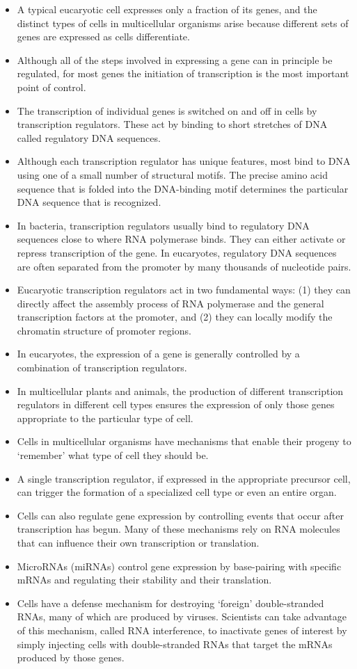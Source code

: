 \begin{itemize}
\item A typical eucaryotic cell expresses only a fraction of its genes, and
the distinct types of cells in multicellular organisms arise because
different sets of genes are expressed as cells differentiate.
\item Although all of the steps involved in expressing a gene can in principle
be regulated, for most genes the initiation of transcription is the
most important point of control.
\item The transcription of individual genes is switched on and off in cells
by transcription regulators. These act by binding to short stretches of
DNA called regulatory DNA sequences.
\item Although each transcription regulator has unique features, most bind
to DNA using one of a small number of structural motifs. The precise
amino acid sequence that is folded into the DNA-binding motif determines
the particular DNA sequence that is recognized.
\item In bacteria, transcription regulators usually bind to regulatory DNA
sequences close to where RNA polymerase binds. They can either
activate or repress transcription of the gene. In eucaryotes, regulatory
DNA sequences are often separated from the promoter by many
thousands of nucleotide pairs.
\item Eucaryotic transcription regulators act in two fundamental ways:
(1) they can directly affect the assembly process of RNA polymerase
and the general transcription factors at the promoter, and (2) they
can locally modify the chromatin structure of promoter regions.
\item In eucaryotes, the expression of a gene is generally controlled by a
combination of transcription regulators.
\item In multicellular plants and animals, the production of different transcription
regulators in different cell types ensures the expression of
only those genes appropriate to the particular type of cell.
\item Cells in multicellular organisms have mechanisms that enable their
progeny to ‘remember’ what type of cell they should be.
\item A single transcription regulator, if expressed in the appropriate precursor
cell, can trigger the formation of a specialized cell type or
even an entire organ.
\item Cells can also regulate gene expression by controlling events that
occur after transcription has begun. Many of these mechanisms
rely on RNA molecules that can influence their own transcription or
translation.
\item MicroRNAs (miRNAs) control gene expression by base-pairing with
specific mRNAs and regulating their stability and their translation.
\item Cells have a defense mechanism for destroying ‘foreign’ double-stranded
RNAs, many of which are produced by viruses. Scientists
can take advantage of this mechanism, called RNA interference, to
inactivate genes of interest by simply injecting cells with double-stranded
RNAs that target the mRNAs produced by those genes.
\end{itemize}
